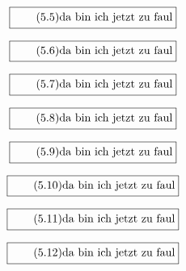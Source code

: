 \documentclass[11pt]{article}
\newcommand{\1}{ {\mathds{1}} }
\begin{document}
    \begin{equation}
      \boxed{
        \tag{5.5}
        \begin{split}
          \text{da bin ich jetzt zu faul}
        \end{split}
      }
    \end{equation}

    \begin{equation}
      \boxed{
        \tag{5.6}
        \begin{split}
          \text{da bin ich jetzt zu faul}
        \end{split}
      }
    \end{equation}

    \begin{equation}
      \boxed{
        \tag{5.7}
        \begin{split}
          \text{da bin ich jetzt zu faul}
        \end{split}
      }
    \end{equation}

    \begin{equation}
      \boxed{
        \tag{5.8}
        \begin{split}
          \text{da bin ich jetzt zu faul}
        \end{split}
      }
    \end{equation}

    \begin{equation}
      \boxed{
        \tag{5.9}
        \begin{split}
          \text{da bin ich jetzt zu faul}
        \end{split}
      }
    \end{equation}

    \begin{equation}
      \boxed{
        \tag{5.10}
        \begin{split}
          \text{da bin ich jetzt zu faul}
        \end{split}
      }
    \end{equation}

    \begin{equation}
      \boxed{
        \tag{5.11}
        \begin{split}
          \text{da bin ich jetzt zu faul}
        \end{split}
      }
    \end{equation}

    \begin{equation}
      \boxed{
        \tag{5.12}
        \begin{split}
          \text{da bin ich jetzt zu faul}
        \end{split}
      }
    \end{equation}
\end{document}
